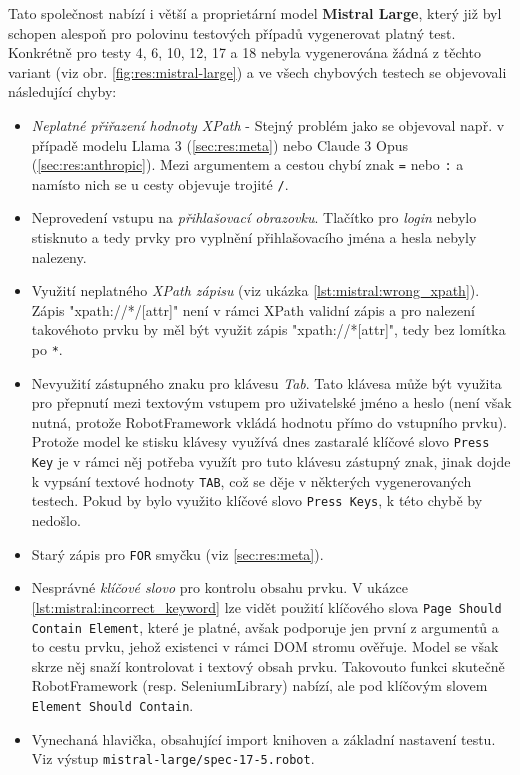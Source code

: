 \documentclass[czech, ma, kiv, he, iso690alph, pdf, viewonly]{fasthesis}
\begin{document}
        \noindent Tato společnost nabízí i větší a proprietární model \textbf{Mistral Large}, který již byl schopen alespoň pro polovinu testových případů vygenerovat platný test. Konkrétně pro testy 4, 6, 10, 12, 17 a 18 nebyla vygenerována žádná z těchto variant (viz obr. \ref{fig:res:mistral-large}) a ve všech chybových testech se objevovali následující chyby:
        \begin{itemize}
            \item \emph{Neplatné přiřazení hodnoty XPath} - Stejný problém jako se objevoval např. v případě modelu Llama 3 (\ref{sec:res:meta}) nebo Claude 3 Opus (\ref{sec:res:anthropic}). Mezi argumentem a cestou chybí znak \verb|=| nebo \verb|:| a namísto nich se u cesty objevuje trojité \verb|/|.
            \item Neprovedení vstupu na \emph{přihlašovací obrazovku}. Tlačítko pro \emph{login} nebylo stisknuto a tedy prvky pro vyplnění přihlašovacího jména a hesla nebyly nalezeny.
            \item Využití neplatného \emph{XPath zápisu} (viz ukázka \ref{lst:mistral:wrong_xpath}). Zápis "xpath://*/[attr]" není v rámci XPath validní zápis a pro nalezení takovéhoto prvku by měl být využit zápis "xpath://*[attr]", tedy bez lomítka po \verb|*|.
            \item Nevyužití zástupného znaku pro klávesu \textit{Tab}. Tato klávesa může být využita pro přepnutí mezi textovým vstupem pro uživatelské jméno a heslo (není však nutná, protože RobotFramework vkládá hodnotu přímo do vstupního prvku). Protože model ke stisku klávesy využívá dnes zastaralé klíčové slovo \verb|Press Key| je v rámci něj potřeba využít pro tuto klávesu zástupný znak, jinak dojde k vypsání textové hodnoty \verb|TAB|, což se děje v některých vygenerovaných testech. Pokud by bylo využito klíčové slovo \verb|Press Keys|, k této chybě by nedošlo.
            \item Starý zápis pro \verb|FOR| smyčku (viz \ref{sec:res:meta}).
            \item Nesprávné \emph{klíčové slovo} pro kontrolu obsahu prvku. V ukázce \ref{lst:mistral:incorrect_keyword} lze vidět použití klíčového slova \verb|Page Should Contain Element|, které je platné, avšak podporuje jen první z argumentů a to cestu prvku, jehož existenci v rámci DOM stromu ověřuje. Model se však skrze něj snaží kontrolovat i textový obsah prvku. Takovouto funkci skutečně RobotFramework (resp. SeleniumLibrary) nabízí, ale pod klíčovým slovem \verb|Element Should Contain|.
            \item Vynechaná hlavička, obsahující import knihoven a základní nastavení testu. Viz výstup \verb|mistral-large/spec-17-5.robot|.
        \end{itemize}
\end{document}
